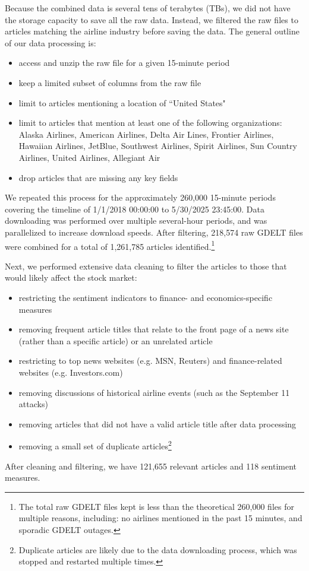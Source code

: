 \documentclass[12pt]{article}
\begin{document}
Because the combined data is several tens of terabytes (TBs), we did not have the storage capacity to save all the raw data. Instead, we filtered the raw files to articles matching the airline industry before saving the data. The general outline of our data processing is:
\begin{itemize}
\singlespacing
    \item access and unzip the raw file for a given 15-minute period
    \item keep a limited subset of columns from the raw file
    \item limit to articles mentioning a location of ``United States"
    \item limit to articles that mention at least one of the following organizations: Alaska Airlines, American Airlines, Delta Air Lines, Frontier Airlines, Hawaiian Airlines, JetBlue, Southwest Airlines, Spirit Airlines, Sun Country Airlines, United Airlines, Allegiant Air
    \item drop articles that are missing any key fields
\end{itemize}
We repeated this process for the approximately 260,000 15-minute periods covering the timeline of 1/1/2018 00:00:00 to 5/30/2025 23:45:00. Data downloading was performed over multiple several-hour periods, and was parallelized to increase download speeds. After filtering, 218,574 raw GDELT files were combined for a total of 1,261,785 articles identified.\footnote{The total raw GDELT files kept is less than the theoretical 260,000 files for multiple reasons, including: no airlines mentioned in the past 15 minutes, and sporadic GDELT outages.}

Next, we performed extensive data cleaning to filter the articles to those that would likely affect the stock market:
\begin{itemize}
\singlespacing
    \item restricting the sentiment indicators to finance- and economics-specific measures
    \item removing frequent article titles that relate to the front page of a news site (rather than a specific article) or an unrelated article
    \item restricting to top news websites (e.g. MSN, Reuters) and finance-related websites (e.g. Investors.com)
    \item removing discussions of historical airline events (such as the September 11 attacks)
    \item removing articles that did not have a valid article title after data processing
    \item removing a small set of duplicate articles\footnote{Duplicate articles are likely due to the data downloading process, which was stopped and restarted multiple times.}
\end{itemize}
After cleaning and filtering, we have 121,655 relevant articles and 118 sentiment measures.
\end{document}
